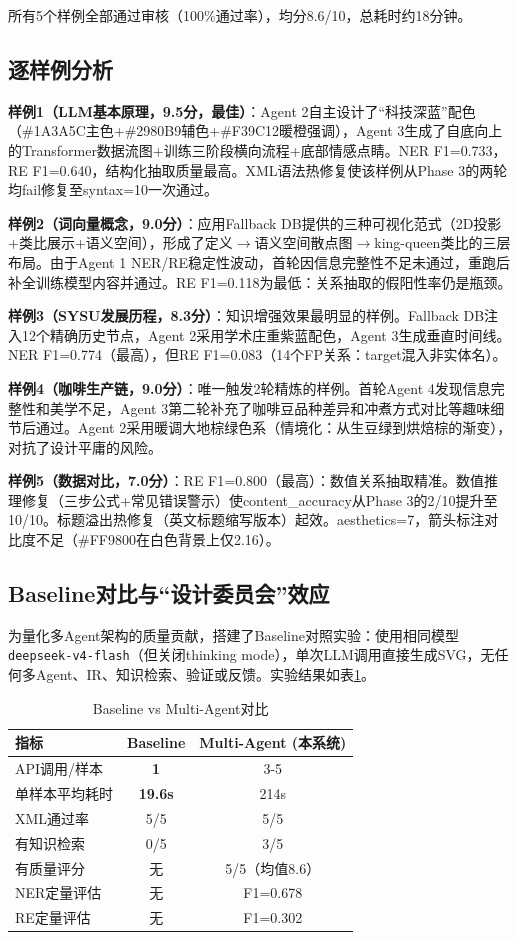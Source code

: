 \documentclass[11pt,a4paper]{article}
\begin{document}
所有5个样例全部通过审核（100\%通过率），均分8.6/10，总耗时约18分钟。

\subsection{逐样例分析}

\textbf{样例1（LLM基本原理，9.5分，最佳）}：Agent 2自主设计了“科技深蓝”配色（\#1A3A5C主色+\#2980B9辅色+\#F39C12暖橙强调），Agent 3生成了自底向上的Transformer数据流图+训练三阶段横向流程+底部情感点睛。NER F1=0.733，RE F1=0.640，结构化抽取质量最高。XML语法热修复使该样例从Phase 3的两轮均fail修复至syntax=10一次通过。

\textbf{样例2（词向量概念，9.0分）}：应用Fallback DB提供的三种可视化范式（2D投影+类比展示+语义空间），形成了定义$\rightarrow$语义空间散点图$\rightarrow$king-queen类比的三层布局。由于Agent 1 NER/RE稳定性波动，首轮因信息完整性不足未通过，重跑后补全训练模型内容并通过。RE F1=0.118为最低：关系抽取的假阳性率仍是瓶颈。

\textbf{样例3（SYSU发展历程，8.3分）}：知识增强效果最明显的样例。Fallback DB注入12个精确历史节点，Agent 2采用学术庄重紫蓝配色，Agent 3生成垂直时间线。NER F1=0.774（最高），但RE F1=0.083（14个FP关系：target混入非实体名）。

\textbf{样例4（咖啡生产链，9.0分）}：唯一触发2轮精炼的样例。首轮Agent 4发现信息完整性和美学不足，Agent 3第二轮补充了咖啡豆品种差异和冲煮方式对比等趣味细节后通过。Agent 2采用暖调大地棕绿色系（情境化：从生豆绿到烘焙棕的渐变），对抗了设计平庸的风险。

\textbf{样例5（数据对比，7.0分）}：RE F1=0.800（最高）：数值关系抽取精准。数值推理修复（三步公式+常见错误警示）使content\_accuracy从Phase 3的2/10提升至10/10。标题溢出热修复（英文标题缩写版本）起效。aesthetics=7，箭头标注对比度不足（\#FF9800在白色背景上仅2.16）。

\subsection{Baseline对比与“设计委员会”效应}

为量化多Agent架构的质量贡献，搭建了Baseline对照实验：使用相同模型\texttt{deepseek-v4-flash}（但关闭thinking mode），单次LLM调用直接生成SVG，无任何多Agent、IR、知识检索、验证或反馈。实验结果如表\ref{tab:baseline}。

\begin{table}[H]
\centering
\caption{Baseline vs Multi-Agent对比}
\label{tab:baseline}
\begin{tabular}{lcc}
\toprule
指标 & Baseline & Multi-Agent (本系统) \\
\midrule
API调用/样本 & \textbf{1} & 3-5 \\
单样本平均耗时 & \textbf{19.6s} & 214s \\
XML通过率 & 5/5 & 5/5 \\
有知识检索 & 0/5 & 3/5 \\
有质量评分 & 无 & 5/5（均值8.6） \\
NER定量评估 & 无 & F1=0.678 \\
RE定量评估 & 无 & F1=0.302 \\
\bottomrule
\end{tabular}
\end{table}
\end{document}
